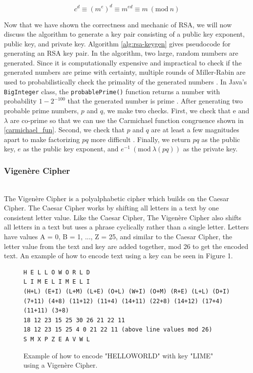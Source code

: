 \documentclass[acmlarge]{acmart}
\newcommand{\Mod}[1]{\ (\mathrm{mod}\ #1)}
\begin{document}
\begin{equation}
	c^{d} \equiv (m^{e})^{d} \equiv m^{ed} \equiv m \Mod{n}
\end{equation}

Now that we have shown the correctness and mechanic of RSA, we will now discuss the algorithm to generate a key pair consisting of a public key exponent, public key, and private key. Algorithm \ref{alg:rsa-keygen} gives pseudocode for generating an RSA key pair. In the algorithm, two large, random numbers are generated. Since it is computationally expensive and impractical to check if the generated numbers are prime with certainty, multiple rounds of Miller-Rabin are used to probabilistically check the primality of the generated numbers \cite{MillerRabin}. In Java's \texttt{BigInteger} class, the \texttt{probablePrime()} function returns a number with probability $1 - 2^{-100}$ that the generated number is prime \cite{BigIntegerDoc}. After generating two probable prime numbers, $p$ and $q$, we make two checks. First, we check that e and $\lambda$ are co-prime so that we can use the Carmichael function congruence shown in \ref{carmichael_fun}. Second, we check that $p$ and $q$ are at least a few magnitudes apart to make factorizing $pq$ more difficult \cite{RSA}. Finally, we return $pq$ as the public key, $e$ as the public key exponent, and $e^{-1} \Mod{\lambda(pq)}$ as the private key.

\subsubsection{Vigen\`{e}re Cipher}
\hspace*{\fill} \\ %
The Vigen\`{e}re Cipher is a polyalphabetic cipher which builds on the Caesar Cipher. The Caesar Cipher works by shifting all letters in a text by one consistent letter value. Like the Caesar Cipher, The Vigen\`{e}re Cipher also shifts all letters in a text but uses a phrase cyclically rather than a single letter. Letters have values A = 0, B = 1, ..., Z = 25, and similar to the Caesar Cipher, the letter value from the text and key are added together, mod 26 to get the encoded text. An example of how to encode text using a key can be seen in Figure 1.

\begin{figure}
\centering
\begin{BVerbatim}
H E L L O W O R L D
L I M E L I M E L I
(H+L) (E+I) (L+M) (L+E) (O+L) (W+I) (O+M) (R+E) (L+L) (D+I)
(7+11) (4+8) (11+12) (11+4) (14+11) (22+8) (14+12) (17+4) (11+11) (3+8)
18 12 23 15 25 30 26 21 22 11
18 12 23 15 25 4 0 21 22 11 (above line values mod 26)
S M X P Z E A V W L
\end{BVerbatim}
\caption{Example of how to encode "HELLOWORLD" with key "LIME" using a Vigen\`{e}re Cipher.}
\label{fig:despython}
\end{figure}
\end{document}
